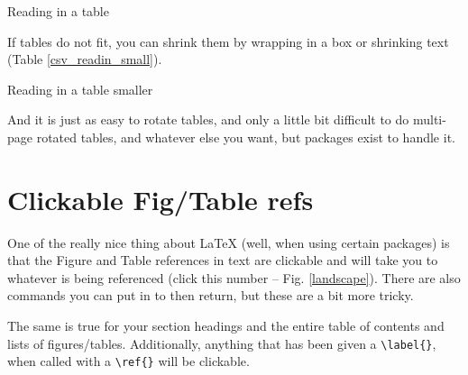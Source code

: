 \begin{table}[h]
\centering
\caption[Normal size table]{Reading in a table}
\label{csv_readin}
\end{table}

If tables do not fit, you can shrink them by wrapping in a box or shrinking text (Table \ref{csv_readin_small}).

\begin{table}[h]
\centering
\caption[Tiny table]{Reading in a table smaller}
\label{csv_readin_small}
\end{table}

And it is just as easy to rotate tables, and only a little bit difficult to do multi-page rotated tables, and whatever else you want, but packages exist to handle it. 

\clearpage %

\section{Clickable Fig/Table refs}

One of the really nice thing about \LaTeX{} (well, when using certain packages) is that the Figure and Table references in text are clickable and will take you to whatever is being referenced (click this number -- Fig. \ref{landscape}). There are also commands you can put in to then return, but these are a bit more tricky. 

The same is true for your section headings and the entire table of contents and lists of figures/tables. Additionally, anything that has been given a \verb+\label{}+, when called with a \verb+\ref{}+ will be clickable. 











